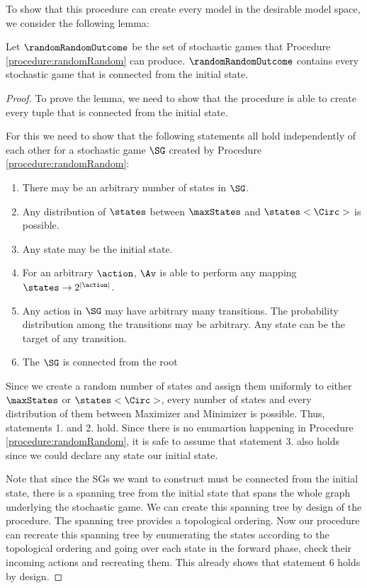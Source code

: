 To show that this procedure can create every model in the desirable model space, we consider the following lemma:
\begin{lemma}
Let $\randomRandomOutcome$ be the set of stochastic games that Procedure \ref{procedure:randomRandom} can produce. $\randomRandomOutcome$ contains every stochastic game that is connected from the initial state.
\end{lemma}
\begin{proof}
To prove the lemma, we need to show that the procedure is able to create every tuple that is connected from the initial state.

For this we need to show that the following statements all hold independently of each other for a stochastic game $\SG$ created by Procedure \ref{procedure:randomRandom}:
\begin{enumerate}
\item There may be an arbitrary number of states in $\SG$.
\item Any distribution of $\states$ between $\maxStates$ and $\states<\Circ>$ is possible.
\item Any state may be the initial state.
\item For an arbitrary $\action$, $\Av$ is able to perform any mapping $\states \rightarrow 2^{|\action|}$.
\item Any action in $\SG$ may have arbitrary many transitions. The probability distribution among the transitions may be arbitrary. Any state can be the target of any transition.
\item The $\SG$ is connected from the root
\end{enumerate}


Since we create a random number of states and assign them uniformly to either $\maxStates$ or $\states<\Circ>$, every number of states and every distribution of them between Maximizer and Minimizer is possible. Thus, statements 1. and 2. hold. Since there is no enumartion happening in Procedure \ref{procedure:randomRandom}, it is safe to assume that statement 3. also holds since we could declare any state our initial state.

Note that since the SGs we want to construct must be connected from the initial state, there is a spanning tree from the initial state that spans the whole graph underlying the stochastic game.
We can create this spanning tree by design of the procedure. The spanning tree provides a topological ordering. Now our procedure can recreate this spanning tree by enumerating the states according to the
topological ordering and going over each state in the forward phase, check their incoming actions and recreating them. This already shows that statement 6 holds by design.


\end{proof}
